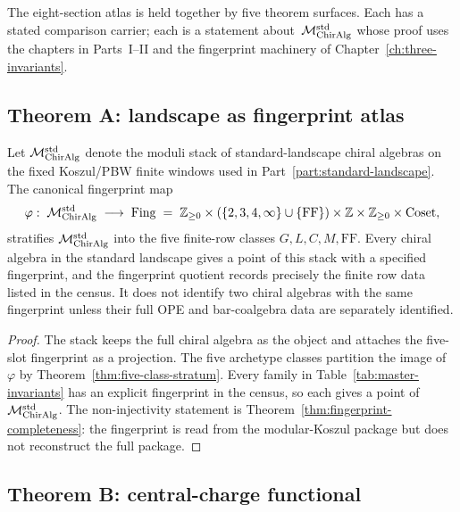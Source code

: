 The eight-section atlas is held together by five theorem surfaces.
Each has a stated comparison carrier; each is a
statement about~$\mathcal{M}_{\mathrm{ChirAlg}}^{\mathrm{std}}$ whose proof uses the
chapters in Parts~I--II and the fingerprint machinery of
Chapter~\ref{ch:three-invariants}.

\subsection{Theorem A: landscape as fingerprint atlas}
\label{sec:part-iii-theorem-A}

\begin{theorem}
\label{thm:part-iii-landscape-as-moduli-stack}
Let $\mathcal{M}_{\mathrm{ChirAlg}}^{\mathrm{std}}$ denote the moduli stack of
standard-landscape chiral algebras on the fixed Koszul/PBW finite
windows used in Part~\ref{part:standard-landscape}. The canonical
fingerprint map
\[
 \varphi:\; \mathcal{M}_{\mathrm{ChirAlg}}^{\mathrm{std}} \;\longrightarrow\;
 \mathrm{Fing} \;=\;
 \mathbb{Z}_{\ge 0} \times (\{2,3,4,\infty\} \cup \{\mathrm{FF}\})
 \times \mathbb{Z} \times \mathbb{Z}_{\ge 0} \times \mathrm{Coset},
\]
stratifies $\mathcal{M}_{\mathrm{ChirAlg}}^{\mathrm{std}}$ into the five finite-row
classes $G,L,C,M,\mathrm{FF}$. Every chiral algebra in the standard
landscape gives a point of this stack with a specified fingerprint,
and the fingerprint quotient records precisely the finite row data
listed in the census. It does not identify two chiral algebras with
the same fingerprint unless their full OPE and bar-coalgebra data
are separately identified.
\end{theorem}
\begin{proof}
The stack keeps the full chiral algebra as the object and attaches
the five-slot fingerprint as a projection. The five archetype classes
partition the image of~$\varphi$ by
Theorem~\ref{thm:five-class-stratum}. Every family in
Table~\ref{tab:master-invariants} has an explicit fingerprint in the
census, so each gives a point of
$\mathcal{M}_{\mathrm{ChirAlg}}^{\mathrm{std}}$. The non-injectivity statement is
Theorem~\ref{thm:fingerprint-completeness}: the fingerprint is read
from the modular-Koszul package but does not reconstruct the full
package.
\end{proof}

\subsection{Theorem B: central-charge functional}
\label{sec:part-iii-theorem-B}

